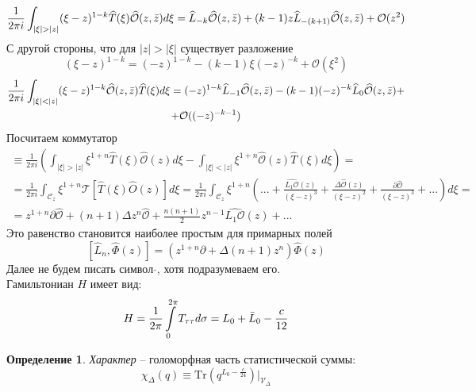 \documentclass[12pt]{article}
\theoremstyle{definition}
\newtheorem{defin}{Определение}[section]
\begin{document}
\begin{equation}
    \frac{1}{2\pi i}\int_{|\xi|>|z|}(\xi-z)^{1-k}\widehat{T}(\xi)\widehat{\mathcal{O}}(z,\Bar{z})d\xi=\widehat{L}_{-k}\widehat{\mathcal{O}}(z,\Bar{z})+(k-1)z\widehat{L}_{-(k+1)}\widehat{\mathcal{O}}(z,\Bar{z})+\mathcal{O}(z^2)
\end{equation}
С другой стороны, что для $|z|>|\xi|$ существует разложение
\begin{equation}
    (\xi-z)^{1-k}=(-z)^{1-k}-(k-1)\xi(-z)^{-k}+\mathcal{O}(\xi^2)
\end{equation}
\begin{multline}
    \frac{1}{2\pi i}\int_{|\xi|<|z|}(\xi-z)^{1-k}\widehat{\mathcal{O}}(z,\Bar{z})\widehat{T}(\xi)d\xi=(-z)^{1-k}\widehat{L}_{-1}\widehat{\mathcal{O}}(z,\Bar{z})-(k-1)(-z)^{-k}\widehat{L}_0\widehat{\mathcal{O}}(z,\Bar{z})+\\+\mathcal{O}((-z)^{-k-1})
\end{multline}
Посчитаем коммутатор
\begin{multline}
    [\widehat{L}_n,\widehat{\mathcal{O}}(z)]\equiv\frac{1}{2\pi i}\left(\int_{|\xi|>|z|}\xi^{1+n}\widehat{T}(\xi)\widehat{\mathcal{O}}(z)d\xi-\int_{|\xi|<|z|}\xi^{1+n}\widehat{\mathcal{O}}(z)\widehat{T}(\xi)d\xi\right)=\\=\frac{1}{2\pi i}\int_{\mathcal{C}_z}\xi^{1+n}\mathcal{T}\left[\widehat{T}(\xi)\widehat{O}(z)\right]d\xi=\frac{1}{2\pi i}\int_{\mathcal{C}_z}\xi^{1+n}\left(...+\frac{\widehat{L_1\mathcal{O}}(z)}{(\xi-z)^3}+\frac{\Delta\widehat{\mathcal{O}}(z)}{(\xi-z)^2}+\frac{\partial\widehat{\mathcal{O}}}{(\xi-z)^3}+...\right)d\xi=\\=z^{1+n}\partial\widehat{\mathcal{O}}+(n+1)\Delta z^n\widehat{\mathcal{O}}+\frac{n(n+1)}{2}z^{n-1}\widehat{L_1\mathcal{O}}(z)+...
\end{multline}
Это равенство становится наиболее простым для примарных полей
\begin{equation}\label{eq14}
    [\widehat{L}_n,\widehat{\Phi}(z)]=(z^{1+n}\partial+\Delta(n+1)z^n)\widehat{\Phi}(z)
\end{equation}
Далее не будем писать символ\; $\widehat{}$\;, хотя подразумеваем его.\\
Гамильтониан $H$ имеет вид:
\begin{equation}
    H=\frac{1}{2\pi}\int\limits_0^{2\pi}T_{\tau\tau}d\sigma=L_0+\Bar{L}_0-\frac{c}{12}
\end{equation}
\begin{defin}
\textit{Характер} -- голоморфная часть статистической суммы:
\begin{equation}
    \chi_\Delta(q)\equiv\text{Tr}(q^{L_0-\frac{c}{24}})\bigg|_{\mathcal{V}_\Delta}
\end{equation}
\end{defin} 
\end{document}
